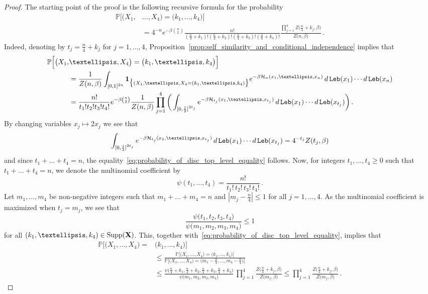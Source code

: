 \documentclass[11pt]{amsart}
\theoremstyle{definition}
\theoremstyle{remark}
\numberwithin{equation}{section}
\newcommand{\bP}{\mathbb P}
\begin{document}
	\begin{proof}
		The starting point of the proof is the following recursive formula for the probability
		\begin{align}
			\nonumber
			\label{eq:probability_of_disc_top_level_equality}
			\bP\Big[\big(X_1,&\ldots,X_4\big) = \big(k_1,\ldots,k_4\big)\Big] \\ &= 4^{-n}e^{-\beta\binom{n}{2}} \frac{n!}{(\frac{n}{4}+k_1)!(\frac{n}{4}+k_2)! (\frac{n}{4}+k_3)! (\frac{n}{4}+k_4)!} \frac{\prod_{j=1}^{4}Z\big(\frac{n}{4} + k_j,\beta\big)}{Z\big(n,\beta\big)} \, .
		\end{align}
		Indeed, denoting by $t_j = \frac{n}{4} + k_j$ for $j=1,\ldots,4$, Proposition~\ref{prop:self_similarity_and_conditional_independence} implies that 
		\begin{align*}
			\bP\Big[\big(X_1,&\ldots,X_4\big) = \big(k_1,\ldots,k_4\big)\Big] \\ &= \frac{1}{Z(n,\beta)} \int_{[0,1]^{2n}} \mathbf{1}_{\big\{(X_1,\ldots,X_4 = (k_1,\ldots,k_4)\big\}} e^{-\beta \mathcal{H}_n(x_1,\ldots,x_n)} \, {\rm d} \, {\tt Leb}(x_1)\cdots {\rm d} \, {\tt Leb}(x_n) \\ &= \frac{n!}{t_1!t_2! t_3! t_4!} e^{-\beta\binom{n}{2}} \frac{1}{Z(n,\beta)} \prod_{j=1}^{4} \bigg( \int_{[0,\frac{1}{2}]^{2t_j}} e^{-\beta \mathcal{H}_{t_j}(x_1,\ldots,x_{t_j})} \, {\rm d} \, {\tt Leb}(x_1)\cdots {\rm d} \, {\tt Leb}(x_{t_j}) \bigg) \, .
		\end{align*}
		By changing variables $x_j \mapsto 2x_j$ we see that
		\[
		\int_{[0,\frac{1}{2}]^{2t_j}} e^{-\beta \mathcal{H}_{t_j}(x_1,\ldots,x_{t_j})} \, {\rm d} \, {\tt Leb}(x_1)\cdots {\rm d} \, {\tt Leb}(x_{t_j}) = 4^{-t_j} Z(t_j,\beta) 
		\]
		and since $t_1+\ldots+t_4 = n$, the equality~\eqref{eq:probability_of_disc_top_level_equality} follows. Now, for integers $t_1,\ldots,t_4\ge 0$ such that $t_1+\ldots+t_4= n$, we denote the multinomial coefficient by
		\[
		\psi(t_1,\ldots,t_4) = \frac{n!}{t_1! \, t_2! \, t_3 ! \,  t_4 !}\, .
		\]
		Let $m_1,\ldots,m_4$ be non-negative integers such that $m_1+\ldots+m_4 = n$ and $|m_j - \frac{n}{4}| \le 1$ for all $j=1,\ldots,4$. As the multinomial coefficient is maximized when $t_j = m_j$, we see that
		\[
		\frac{\psi\big(t_1 , t_2 , t_3, t_4 \big)}{\psi\big(m_1,m_2,m_3,m_4\big)} \le 1 
		\]
		for all $(k_1,\ldots,k_4)\in \text{Supp}(\bf{X})$. This, together with~\eqref{eq:probability_of_disc_top_level_equality}, implies that
		\begin{align*}
			\bP\Big[\big(X_1,\ldots,X_4\big) = & \big(k_1,\ldots,k_4\big)\Big] \\ &\le \frac{\bP\Big[\big(X_1,\ldots,X_4\big) = \big(k_1,\ldots,k_4\big)\Big]}{\bP\Big[\big(X_1,\ldots,X_4\big) = \big(m_1 - \frac{n}{4},\ldots,m_4 - \frac{n}{4}\big)\Big]} \\ & \le \frac{\psi\big(\frac{n}{4} + k_1 , \frac{n}{4} + k_2 , \frac{n}{4} + k_3, \frac{n}{4} + k_4 \big)}{\psi\big(m_1,m_2,m_3,m_4\big)} \, \prod_{j=1}^{4} \frac{Z\big(\frac{n}{4} + k_j,\beta\big)}{Z\big(m_j ,\beta\big)} \le \prod_{j=1}^{4} \frac{Z\big(\frac{n}{4} + k_j,\beta\big)}{Z\big(m_j ,\beta\big)}\, .

\end{align*}
\end{proof}
\end{document}
